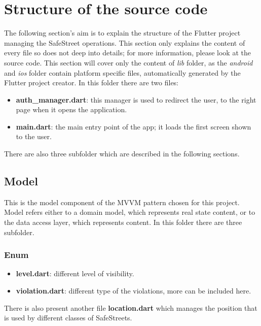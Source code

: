 \documentclass[../ITD.tex]{subfiles}
\begin{document}
    \chapter{Structure of the source code}\label{ch:structure-of-the-source-code}
    The following section's aim is to explain the structure of the Flutter project managing the SafeStreet operations. This section only explains the content of every file so does not deep into details; for more information, please look at the source code. This section will cover only the content of \textit{lib} folder, as the \textit{android} and \textit{ios} folder contain platform specific files, automatically generated by the Flutter project creator.
    In this folder there are two files:
    \begin{itemize}
        \item \textbf{auth\_manager.dart}: this manager is used to redirect the user, to the right page when it opens the application.
        \item \textbf{main.dart}: the main entry point of the app; it loads the first screen shown to the user.
    \end{itemize}
    There are also three subfolder which are described in the following sections.
    \section{Model}\label{sec:model}
    This is the model component of the MVVM pattern chosen for this project.
    Model refers either to a domain model, which represents real state content, or to the data access layer, which represents content.
    In this folder there are three subfolder.
    \subsection{Enum}\label{subsec:enum}
    \begin{itemize}
        \item \textbf{level.dart}: different level of visibility.
        \item \textbf{violation.dart}: different type of the violations, more can be included here.
    \end{itemize}
    There is also present another file \textbf{location.dart} which manages the position that is used by different classes of SafeStreets.
\end{document}
